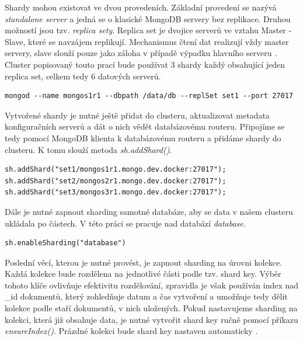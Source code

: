 Shardy mohou existovat ve dvou provedeních. Základní provedení se nazývá \emph{standalone server} a jedná se o klasické MongoDB servery bez replikace. Druhou možností jsou tzv. \emph{replica sety}. Replica set je dvojice serverů ve vztahu Master - Slave, které se navzájem replikují. Mechanismus čtení dat realizují vždy master servery, slave slouží pouze jako záloha v případě výpadku hlavního serveru \cite{mongoCluster}. Cluster popisovaný touto prací bude používat 3 shardy každý obsahující jeden replica set, celkem tedy 6 datových serverů. 

\begin{lstlisting}[caption={Spuštění jednoho MongoDB shardu na portu 27017 zapojeného do replica setu set1}]
mongod --name mongos1r1 --dbpath /data/db --replSet set1 --port 27017
\end{lstlisting}

Vytvořené shardy je nutné ještě přidat do clusteru, aktualizovat metadata konfiguračních serverů a dát o nich vědět databázovému routeru.
Připojíme se tedy pomocí MongoDB klienta k databázovému routeru a přidáme shardy do clusteru.
K tomu slouží metoda \emph{sh.addShard()}. 
\begin{lstlisting}[caption={Nastavení MongoDB shardu na databázovém routeru}]
sh.addShard("set1/mongos1r1.mongo.dev.docker:27017");
sh.addShard("set2/mongos2r1.mongo.dev.docker:27017");
sh.addShard("set3/mongos3r1.mongo.dev.docker:27017");
\end{lstlisting}

Dále je nutné zapnout sharding samotné databáze, aby se data v našem clusteru ukládala po částech. V této práci se pracuje nad databází \emph{database}.

\begin{lstlisting}[caption={Zapnutí shardingu nad databází database v MongoDB}]
sh.enableSharding("database")
\end{lstlisting}

Poslední věcí, kterou je nutné provést, je zapnout sharding na úrovni kolekce. Každá kolekce bude rozdělena na jednotlivé části podle tzv. shard key. Výběr tohoto klíče ovlivňuje efektivitu rozdělování, zpravidla je však používán index nad \_id dokumentů, který zohledňuje datum a čas vytvoření a umožňuje tedy dělit kolekce podle staří dokumentů, v nich uložených. Pokud nastavujeme sharding na kolekci, která již obsahuje data, je nutné vytvořit shard key ručně pomocí příkazu \emph{ensureIndex()}. Prázdné kolekci bude shard key nastaven automaticky \cite{mongoCluster}.
\pagebreak

